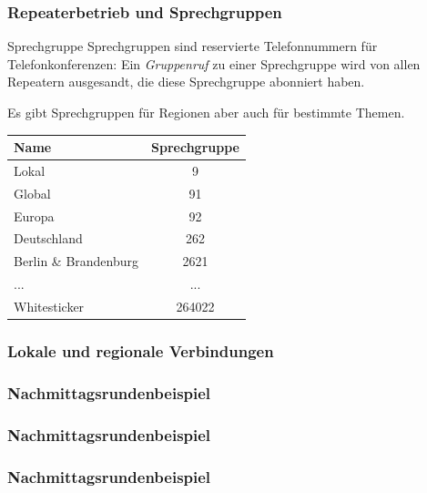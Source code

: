 \documentclass[aspectratio=169]{beamer}
\begin{document}
\begin{frame} \frametitle{Repeaterbetrieb und Sprechgruppen}
 \begin{block}{Sprechgruppe}
  Sprechgruppen sind reservierte Telefonnummern für Telefonkonferenzen: Ein \emph{Gruppenruf} zu einer Sprechgruppe wird von allen Repeatern ausgesandt, die diese Sprechgruppe abonniert haben.
  
  Es gibt Sprechgruppen für Regionen aber auch für bestimmte Themen.
 \end{block}
 \begin{center}
  \begin{tabular}{|l|c|} \hline
  Name & Sprechgruppe \\ \hline
  Lokal & 9 \\
  Global & 91 \\
  Europa & 92 \\
  Deutschland & 262 \\
  Berlin \& Brandenburg & 2621 \\
  ... & ... \\
  Whitesticker & 264022\\ \hline
 \end{tabular}
 \end{center}
\end{frame}

\begin{frame}\frametitle{Lokale und regionale Verbindungen}
 \begin{center}
  
 \end{center} 
\end{frame}

\begin{frame}\frametitle{Nachmittagsrundenbeispiel}
 \begin{center}
  
 \end{center}
\end{frame}

\begin{frame}\frametitle{Nachmittagsrundenbeispiel}
 \begin{center}
  
 \end{center}
\end{frame}

\begin{frame}\frametitle{Nachmittagsrundenbeispiel}
 \begin{center}
  
 \end{center}
\end{frame}
\end{document}

